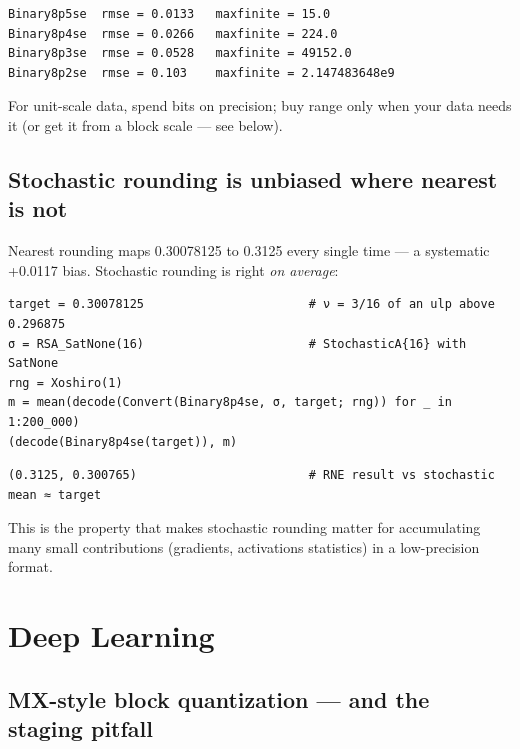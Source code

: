 \begin{verbatim}
Binary8p5se  rmse = 0.0133   maxfinite = 15.0
Binary8p4se  rmse = 0.0266   maxfinite = 224.0
Binary8p3se  rmse = 0.0528   maxfinite = 49152.0
Binary8p2se  rmse = 0.103    maxfinite = 2.147483648e9
\end{verbatim}



For unit-scale data, spend bits on precision; buy range only when your data needs it (or get it from a block scale — see below).



\subsection{Stochastic rounding is unbiased where nearest is not}



\label{4196957658022129611}{}


Nearest rounding maps 0.30078125 to 0.3125 every single time — a systematic +0.0117 bias. Stochastic rounding is right \emph{on average}:




\begin{verbatim}
target = 0.30078125                       # ν = 3/16 of an ulp above 0.296875
σ = RSA_SatNone(16)                       # StochasticA{16} with SatNone
rng = Xoshiro(1)
m = mean(decode(Convert(Binary8p4se, σ, target; rng)) for _ in 1:200_000)
(decode(Binary8p4se(target)), m)
\end{verbatim}




\begin{verbatim}
(0.3125, 0.300765)                        # RNE result vs stochastic mean ≈ target
\end{verbatim}



This is the property that makes stochastic rounding matter for accumulating many small contributions (gradients, activations statistics) in a low-precision format.



\section{Deep Learning}



\label{15209394077164581735}{}


\subsection{MX-style block quantization — and the staging pitfall}



